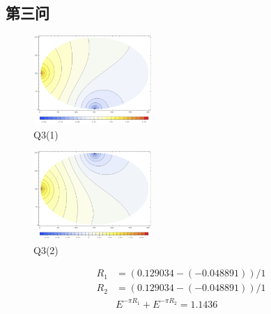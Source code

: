 \documentclass[10pt, a4paper]{article}
\begin{document}
    \subsection{第三问}
    \begin{figure}[H]
        \centering
        \includegraphics[width=0.4\textwidth]{Q3(1).png}
        \caption{Q3(1)}\label{fig:Q3(1)}
    \end{figure}
    \begin{figure}[H]
        \centering
        \includegraphics[width=0.4\textwidth]{Q3(2).png}
        \caption{Q3(2)}\label{fig:Q3(2)}
    \end{figure}

    \begin{align*}
        R_1&=(0.129034 - (-0.048891))/1\\
        R_2&=(0.129034 - (-0.048891))/1\\
        &E^{-\pi R_1}+E^{-\pi R_2}=1.1436
    \end{align*}
\end{document}
